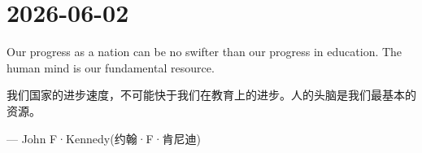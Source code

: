 \section*{2026-06-02}
Our progress as a nation can be no swifter than our progress in education. The human mind is our fundamental resource. \par
我们国家的进步速度，不可能快于我们在教育上的进步。人的头脑是我们最基本的资源。 \par
\hfill --- John F·Kennedy(约翰·F·肯尼迪) \par
